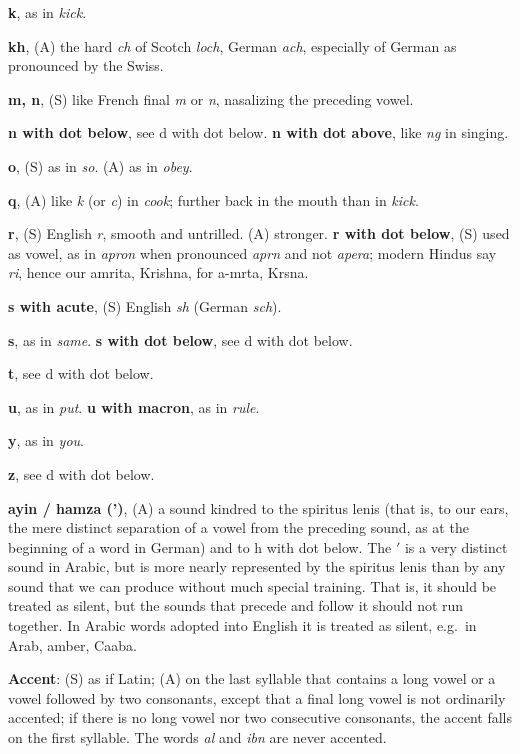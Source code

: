 \documentclass[11pt,a4paper]{article}
\begin{document}
\smallskip
\noindent\textbf{k}, as in \textit{kick}.

\smallskip
\noindent\textbf{kh}, (A) the hard \textit{ch} of Scotch \textit{loch}, German \textit{ach}, especially of German as pronounced by the Swiss.

\smallskip
\noindent\textbf{m, n}, (S) like French final \textit{m} or \textit{n}, nasalizing the preceding vowel.

\smallskip
\noindent\textbf{n with dot below}, see d with dot below. \textbf{n with dot above}, like \textit{ng} in singing.

\smallskip
\noindent\textbf{o}, (S) as in \textit{so}. (A) as in \textit{obey}.

\smallskip
\noindent\textbf{q}, (A) like \textit{k} (or \textit{c}) in \textit{cook}; further back in the mouth than in \textit{kick}.

\smallskip
\noindent\textbf{r}, (S) English \textit{r}, smooth and untrilled. (A) stronger. \textbf{r with dot below}, (S) used as vowel, as in \textit{apron} when pronounced \textit{aprn} and not \textit{apera}; modern Hindus say \textit{ri}, hence our amrita, Krishna, for a-mrta, Krsna.

\smallskip
\noindent\textbf{s with acute}, (S) English \textit{sh} (German \textit{sch}).

\smallskip
\noindent\textbf{s}, as in \textit{same}. \textbf{s with dot below}, see d with dot below.

\smallskip
\noindent\textbf{t}, see d with dot below.

\smallskip
\noindent\textbf{u}, as in \textit{put}. \textbf{u with macron}, as in \textit{rule}.

\smallskip
\noindent\textbf{y}, as in \textit{you}.

\smallskip
\noindent\textbf{z}, see d with dot below.

\smallskip
\noindent\textbf{ayin / hamza (')}, (A) a sound kindred to the spiritus lenis (that is, to our ears, the mere distinct separation of a vowel from the preceding sound, as at the beginning of a word in German) and to h with dot below. The $'$ is a very distinct sound in Arabic, but is more nearly represented by the spiritus lenis than by any sound that we can produce without much special training. That is, it should be treated as silent, but the sounds that precede and follow it should not run together. In Arabic words adopted into English it is treated as silent, e.g.\ in Arab, amber, Caaba.

\smallskip
\noindent\textbf{Accent}: (S) as if Latin; (A) on the last syllable that contains a long vowel or a vowel followed by two consonants, except that a final long vowel is not ordinarily accented; if there is no long vowel nor two consecutive consonants, the accent falls on the first syllable. The words \textit{al} and \textit{ibn} are never accented.
\end{document}
